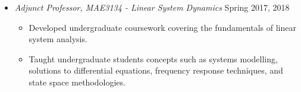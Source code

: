 \begin{itemize}
\begin{itemize}
            \end{itemize}
        \item[] \textit{Adjunct Professor, MAE3134 - Linear System Dynamics} \hfill {Spring 2017, 2018}
        \begin{itemize}
            \item Developed undergraduate coursework covering the fundamentals of linear system analysis.
            \item Taught undergraduate students concepts such as systems modelling, solutions to differential equations, frequency response techniques, and state space methodologies. 
        \end{itemize}
    \end{itemize}
    
